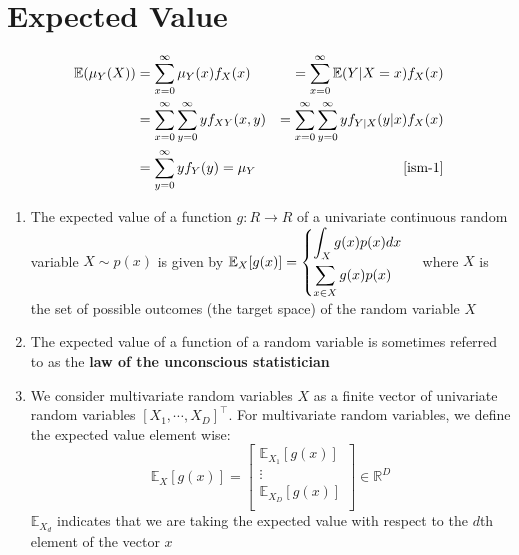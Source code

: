 \section{Expected Value \cite{ism-1,mfml-1}}\label{Multivariate Distributions: Expected Value}
\begin{align*}
    \mathbb{E}(\mu_Y(X))
    &= \displaystyle\sum_{x=0}^{\infty} \mu_Y(x)f_X(x)
    &= \displaystyle\sum_{x=0}^{\infty} 
        \mathbb{E}(Y|X=x)f_X(x) \\
    &= \displaystyle\sum_{x=0}^{\infty}
        \displaystyle\sum_{y=0}^{\infty} yf_{XY}(x,y)
    &= \displaystyle\sum_{x=0}^{\infty}
        \displaystyle\sum_{y=0}^{\infty} yf_{Y|X}(y|x)f_X(x) \\
    &= \displaystyle\sum_{y=0}^{\infty} yf_Y(y) = \mu_Y
    & \text{\cite{ism-1}}
\end{align*}


\begin{enumerate}
    \item The expected value of a function $g : R \to R$ of a univariate continuous random variable $X \sim p(x)$ is given by $
        \mathbb{E}_X[g(x)] = 
        \begin{cases}
            \displaystyle\int_X g(x)p(x)dx \\[2ex]
            \displaystyle\sum_{x\in X} g(x)p(x)
        \end{cases}
    $ where $X$ is the set of possible outcomes (the target space) of the random variable $X$

    \item The expected value of a function of a random variable is sometimes referred to as the \textbf{law of the unconscious statistician}

    \item We consider multivariate random variables $X$ as a finite vector of univariate random variables $[X_1, \cdots , X_D]^\top$. For multivariate random variables, we define the expected value element wise:
    \[
        \mathbb{E}_X[g(x)]
        = \begin{bmatrix}
            \mathbb{E}_{X_1}[g(x)] \\
            \vdots \\
            \mathbb{E}_{X_D}[g(x)] \\
        \end{bmatrix} \in \mathbb{R}^D
    \]
    $\mathbb{E}_{X_d}$ indicates that we are taking the expected value with respect to the $d$th element of the vector $x$


\end{enumerate}

